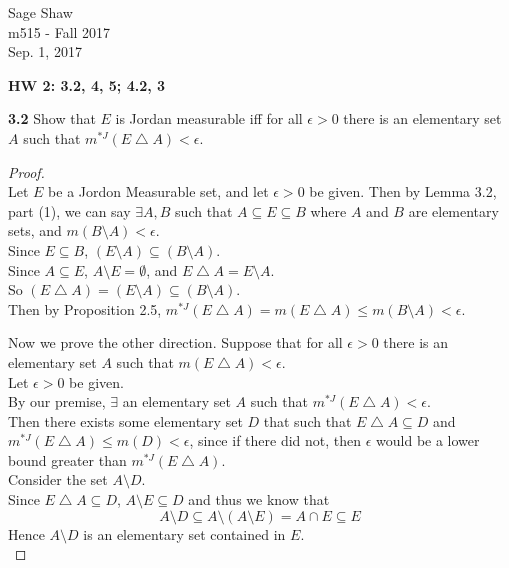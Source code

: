 \documentclass[12pt]{article}
\begin{document}
	\thispagestyle{empty}
	
\begin{flushright}
	Sage Shaw \\
	m515 - Fall 2017 \\
	Sep. 1, 2017
\end{flushright}
	
{\large \textbf{HW 2: 3.2, 4, 5; 4.2, 3}}\bigbreak

\hspace{-4 ex}\textbf{3.2} Show that $E$ is Jordan measurable iff for all $\epsilon>0$ there is an elementary set $A$ such that $m^{*J}(E\bigtriangleup A)<\epsilon$. \bigbreak

	\begin{proof}\text{ }\\
		Let $E$ be a Jordon Measurable set, and let $\epsilon >0$ be given. Then by Lemma 3.2, part (1), we can say $\exists A,B$ such that $A \subseteq E \subseteq B$ where $A$ and $B$ are elementary sets, and $m(B\setminus A)< \epsilon$. \\
		Since $E \subseteq B$, $(E \setminus A) \subseteq (B \setminus A)$. \\
		Since $A \subseteq E$, $A \setminus E = \emptyset$, and $E \bigtriangleup A = E \setminus A$. \\ 
		So $(E \bigtriangleup A) = (E \setminus A) \subseteq (B \setminus A)$.\\
		Then by Proposition 2.5, $m^{*J}(E \bigtriangleup A) = m(E \bigtriangleup A) \leq m(B \setminus A) < \epsilon$.\bigbreak
		
		Now we prove the other direction. Suppose that for all $\epsilon>0$ there is an elementary set $A$ such that $m(E\bigtriangleup A)<\epsilon$.\\
		
		Let $\epsilon > 0$ be given. \\
		
		By our premise, $\exists $ an elementary set $A$ such that $m^{*J}(E\bigtriangleup A)<\epsilon$. \\
		
		Then there exists some elementary set $D$ that such that $E \bigtriangleup A \subseteq D$ and $m^{*J}(E\bigtriangleup A) \leq m(D) < \epsilon$, since if there did not, then $\epsilon$ would be a lower bound greater than $m^{*J}(E\bigtriangleup A)$. \\
		
		Consider the set $A \setminus D$. \\
		Since $E \bigtriangleup A \subseteq D$, $A \setminus E \subseteq D$ and thus we know that $$A \setminus D \subseteq A \setminus (A \setminus E) = A \cap E \subseteq E$$
		Hence $A \setminus D$ is an elementary set contained in $E$. \\
		

\end{proof}
\end{document}
